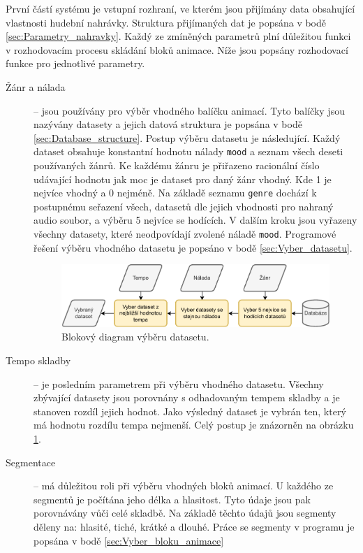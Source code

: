 První částí systému je vstupní rozhraní, ve kterém jsou přijímány data obsahující vlastnosti hudební nahrávky. Struktura přijímaných dat je popsána v bodě \ref{sec:Parametry_nahravky}. Každý ze zmíněných parametrů plní důležitou funkci v rozhodovacím procesu skládání bloků animace. Níže jsou popsány rozhodovací funkce pro jednotlivé parametry.

\begin{description}
    \item[Žánr a nálada] -- jsou používány pro výběr vhodného balíčku animací. Tyto balíčky jsou nazývány datasety a jejich datová struktura je popsána v bodě \ref{sec:Database_structure}. Postup výběru datasetu je následující. Každý dataset obsahuje konstantní hodnotu nálady \texttt{mood} a seznam všech deseti používaných žánrů. Ke každému žánru je přiřazeno racionální číslo udávající hodnotu jak moc je dataset pro daný žánr vhodný. Kde 1 je nejvíce vhodný a 0 nejméně. Na základě seznamu \texttt{genre} dochází k postupnému seřazení všech, datasetů dle jejich vhodnosti pro nahraný audio soubor, a výběru 5 nejvíce se hodících. V dalším kroku jsou vyřazeny všechny datasety, které neodpovídají zvolené náladě \texttt{mood}. Programové řešení výběru vhodného datasetu je popsáno v bodě \ref{sec:Vyber_datasetu}.
    
    \begin{figure}[H]
        \centering
        \includegraphics[width = 1\linewidth]{obrazky/Dataset_selection_diagram.pdf}
        \caption{Blokový diagram výběru datasetu.}
        \label{fig:Dataset_selection_diagram}
    \end{figure}

    \item[Tempo skladby] -- je posledním parametrem při výběru vhodného datasetu. Všechny zbývající datasety jsou porovnány s odhadovaným tempem skladby a je stanoven rozdíl jejich hodnot. Jako výsledný dataset je vybrán ten, který má hodnotu rozdílu tempa nejmenší. Celý postup je znázorněn na obrázku \ref{fig:Dataset_selection_diagram}.
    
    \item[Segmentace] -- má důležitou roli při výběru vhodných bloků animací. U každého ze segmentů je počítána jeho délka a hlasitost. Tyto údaje jsou pak porovnávány vůči celé skladbě. Na základě těchto údajů jsou segmenty děleny na: hlasité, tiché, krátké a dlouhé. Práce se segmenty v programu je popsána v bodě \ref{sec:Vyber_bloku_animace}


\end{description}
